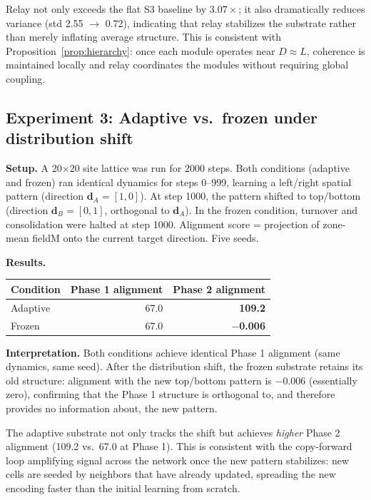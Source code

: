 \documentclass[12pt]{article}
\begin{document}
Relay not only exceeds the flat S3 baseline by $3.07\times$; it also dramatically reduces variance (std 2.55 $\to$ 0.72), indicating that relay stabilizes the substrate rather than merely inflating average structure. This is consistent with Proposition~\ref{prop:hierarchy}: once each module operates near $D \approx L$, coherence is maintained locally and relay coordinates the modules without requiring global coupling.

\subsection{Experiment 3: Adaptive vs.\ frozen under distribution shift}
\label{sec:exp3}

\textbf{Setup.} A 20$\times$20 site lattice was run for 2000 steps. Both conditions (adaptive and frozen) ran identical dynamics for steps 0--999, learning a left/right spatial pattern (direction $\mathbf{d}_A = [1,0]$). At step 1000, the pattern shifted to top/bottom (direction $\mathbf{d}_B = [0,1]$, orthogonal to $\mathbf{d}_A$). In the frozen condition, turnover and consolidation were halted at step 1000. Alignment score = projection of zone-mean fieldM onto the current target direction. Five seeds.

\textbf{Results.}
\begin{center}
\begin{tabular}{lrr}
\toprule
Condition & Phase 1 alignment & Phase 2 alignment \\
\midrule
Adaptive & 67.0 & \textbf{109.2} \\
Frozen   & 67.0 & \textbf{$-$0.006} \\
\bottomrule
\end{tabular}
\end{center}

\textbf{Interpretation.} Both conditions achieve identical Phase 1 alignment (same dynamics, same seed). After the distribution shift, the frozen substrate retains its old structure: alignment with the new top/bottom pattern is $-0.006$ (essentially zero), confirming that the Phase 1 structure is orthogonal to, and therefore provides no information about, the new pattern.

The adaptive substrate not only tracks the shift but achieves \emph{higher} Phase 2 alignment (109.2 vs.\ 67.0 at Phase 1). This is consistent with the copy-forward loop amplifying signal across the network once the new pattern stabilizes: new cells are seeded by neighbors that have already updated, spreading the new encoding faster than the initial learning from scratch.
\end{document}
